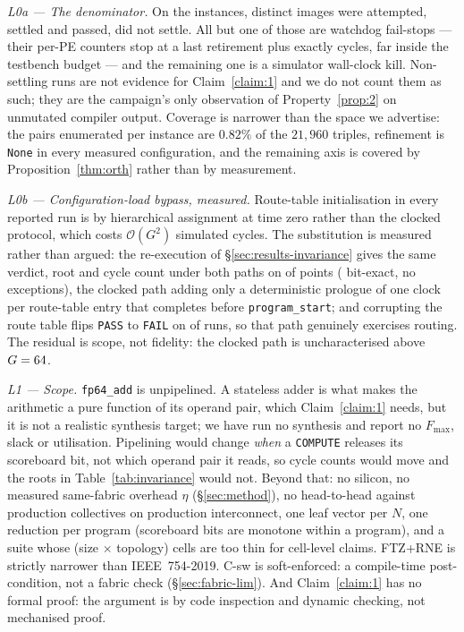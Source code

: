 \documentclass[journal,10pt]{IEEEtran}
\theoremstyle{plain}
\theoremstyle{definition}
\theoremstyle{remark}
\newcommand{\sv}[1]{\texttt{#1}}
\begin{document}
\emph{L0a --- The denominator.} On the \TournNInst{} instances,
\InvAttempted{} distinct images were attempted, \WallTBs{} settled and passed,
\InvNonSettling{} did not settle. All but one of those are watchdog
fail-stops --- their per-PE counters stop at a last retirement plus exactly
\WatchdogMax{} cycles, far inside the testbench budget --- and the remaining
one is a simulator wall-clock kill. Non-settling runs are not evidence for
Claim~\ref{claim:1} and we do not count them as such; they are the campaign's
only observation of Property~\ref{prop:2} on unmutated compiler output.
Coverage is narrower than the space we advertise: the \SelConfigsTotal{} pairs
enumerated per instance are $0.82\%$ of the $21{,}960$ triples, refinement is
\sv{None} in every measured configuration, and the remaining axis is covered
by Proposition~\ref{thm:orth} rather than by measurement.

\emph{L0b --- Configuration-load bypass, measured.} Route-table
initialisation in every reported run is by hierarchical assignment at time zero
rather than the clocked protocol, which costs $\mathcal{O}(G^2)$ simulated
cycles. The substitution is measured rather than argued: the re-execution of
\S\ref{sec:results-invariance} gives the same verdict, root and cycle count
under both paths on \RouteRuns{} of \RouteRuns{} points (\RouteBitExact{}
bit-exact, no exceptions), the clocked path adding only a deterministic
prologue of one clock per route-table entry that completes before
\sv{program\_start}; and corrupting the route table flips \sv{PASS} to
\sv{FAIL} on \RouteNegCtrl{} of \RouteNegCtrl{} runs, so that path genuinely
exercises routing. The residual is scope, not fidelity: the clocked path is
uncharacterised above $G = 64$.

\emph{L1 --- Scope.} \sv{fp64\_add} is unpipelined. A stateless adder is what
makes the arithmetic a pure function of its operand pair, which
Claim~\ref{claim:1} needs, but it is not a realistic synthesis target; we have
run no synthesis and report no $F_{\max}$, slack or utilisation. Pipelining
would change \emph{when} a \texttt{COMPUTE} releases its scoreboard bit, not
which operand pair it reads, so cycle counts would move and the roots in
Table~\ref{tab:invariance} would not. Beyond that: no silicon, no measured
same-fabric overhead $\eta$ (\S\ref{sec:method}), no head-to-head against
production collectives on production interconnect, one leaf vector per $N$,
one reduction per program (scoreboard bits are monotone within a program), and
a suite whose (size $\times$ topology) cells are too thin for cell-level
claims. FTZ+RNE is strictly narrower than IEEE~754-2019. \textsf{C-sw} is
soft-enforced: a compile-time post-condition, not a fabric check
(\S\ref{sec:fabric-lim}). And Claim~\ref{claim:1} has no formal proof: the
argument is by code inspection and dynamic checking, not mechanised proof.
\end{document}
